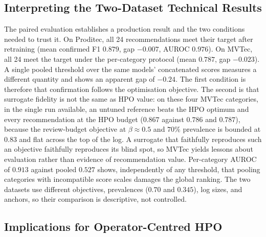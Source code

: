 \documentclass[final,5p,times,twocolumn]{elsarticle}
\begin{document}
\subsection{Interpreting the Two-Dataset Technical Results}
\label{subsec:discussion-technical}

The paired evaluation establishes a production result and the two
conditions needed to trust it. On Proditec, all 24 recommendations meet
their target after retraining (mean confirmed F1 $0.879$, gap $-0.007$,
AUROC $0.976$). On MVTec, all 24 meet the target under the per-category
protocol (mean $0.787$, gap $-0.023$). A single pooled threshold over the same models' concatenated scores measures a different quantity and shows an apparent gap of $-0.24$. The first condition is therefore that confirmation follows the optimisation objective. The second is that surrogate fidelity is not
the same as HPO value: on these four MVTec categories, in the single run available, an untuned reference beats the HPO optimum and every recommendation at the HPO
budget ($0.867$ against $0.786$ and $0.787$), because the review-budget
objective at $\beta \approx 0.5$ and $70\%$ prevalence is bounded at
$0.83$ and flat across the top of the log. A surrogate that faithfully reproduces such an objective faithfully reproduces its blind spot, so MVTec yields lessons about evaluation rather than evidence of recommendation value.
Per-category AUROC of $0.913$ against pooled $0.527$ shows,
independently of any threshold, that pooling categories with incompatible score scales damages the global ranking. The two
datasets use different objectives, prevalences ($0.70$ and $0.345$),
log sizes, and anchors, so their comparison is descriptive, not
controlled. 

\subsection{Implications for Operator-Centred HPO}
\label{subsec:discussion-operator}
\end{document}
